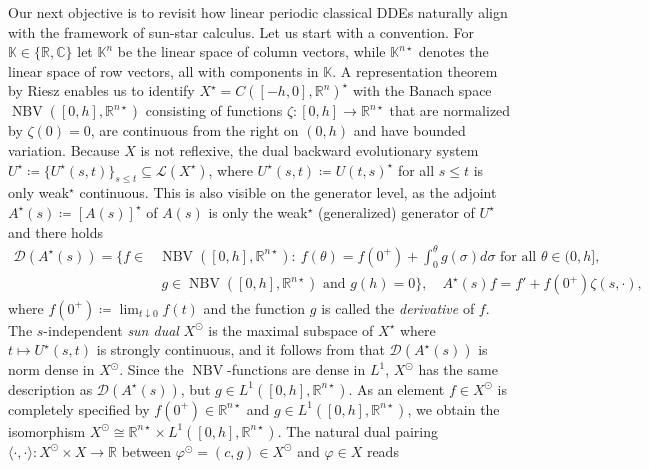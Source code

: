 \documentclass[english]{myarticle}
\DeclareMathOperator{\NBV}{NBV}
\begin{document}
\begin{sloppypar}
Our next objective is to revisit how linear periodic classical DDEs naturally align with the framework of sun-star calculus. Let us start with a convention. For $\mathbb{K} \in \{ \mathbb{R}, \mathbb{C} \}$ let $\mathbb{K}^n$ be the linear space of column vectors, while $\mathbb{K}^{n \star}$ denotes the linear space of row vectors, all with components in $\mathbb{K}$. A representation theorem by Riesz \cite{Riesz1914} enables us to identify $X^\star = C([-h,0],\mathbb{R}^n)^\star$ with the Banach space $\NBV([0,h],\mathbb{R}^{n\star})$ consisting of functions $\zeta : [0,h] \to \mathbb{R}^{n \star}$ that are normalized by $\zeta(0) = 0$, are continuous from the right on $(0,h)$ and have bounded variation. Because $X$ is not reflexive, the dual backward evolutionary system $U^\star \coloneqq \{U^\star(s,t)\}_{s \leq t} \subseteq \mathcal{L}(X^\star)$, where $U^\star(s,t) \coloneqq U(t,s)^\star$ for all $s \leq t$ is only weak$^\star$ continuous. This is also visible on the generator level, as the adjoint $A^\star(s) \coloneqq [A(s)]^\star$ of $A(s)$ is only the weak$^\star$ (generalized) generator of $U^\star$ and there holds
\begin{align} \label{eq:D(Astars)}
    \mathcal{D}(A^\star(s)) = \bigg\{  f \in & \NBV([0,h],\mathbb{R}^{n \star}) : \  f(\theta) =  f(0^+) + \int_0^\theta g(\sigma) d\sigma \mbox{ for all }  \theta \in (0,h], \nonumber \\
     & \ g \in \NBV([0,h],\mathbb{R}^{n\star}) \mbox{ and }  g(h) = 0 \bigg \}, \quad A^\star(s) f = f' + f(0^+) \zeta(s,\cdot),
\end{align}
where $f(0^+) \coloneqq \lim_{t \downarrow 0} f(t)$ and the function $g$ is called the \emph{derivative} of $f$. The $s$-independent \emph{sun dual} $X^\odot$ is the maximal subspace of $X^\star$ where $t \mapsto U^\star(s,t)$ is strongly continuous, and it follows from \cite[Lemma 1]{Article2} that $\mathcal{D}(A^\star(s))$ is norm dense in $X^\odot$. Since the $\NBV$-functions are dense in $L^1$, $X^\odot$ has the same description as $\mathcal{D}(A^\star(s))$, but $g \in L^1([0,h],\mathbb{R}^{n\star})$. As an element $f \in X^\odot$ is completely specified by $f(0^+) \in \mathbb{R}^{n \star}$ and $g \in L^1([0,h],\mathbb{R}^{n\star})$, we obtain the isomorphism $X^{\odot} \cong \mathbb{R}^{n \star} \times L^1([0,h],\mathbb{R}^{n\star})$. The natural dual pairing $\langle \cdot , \cdot \rangle : X^\odot \times X \to \mathbb{R}$ between $\varphi^\odot = (c,g) \in X^\odot$ and $\varphi \in X$ reads
\begin{equation} \label{eq:Xsunpairing} 

\end{equation}
\end{sloppypar}
\end{document}
